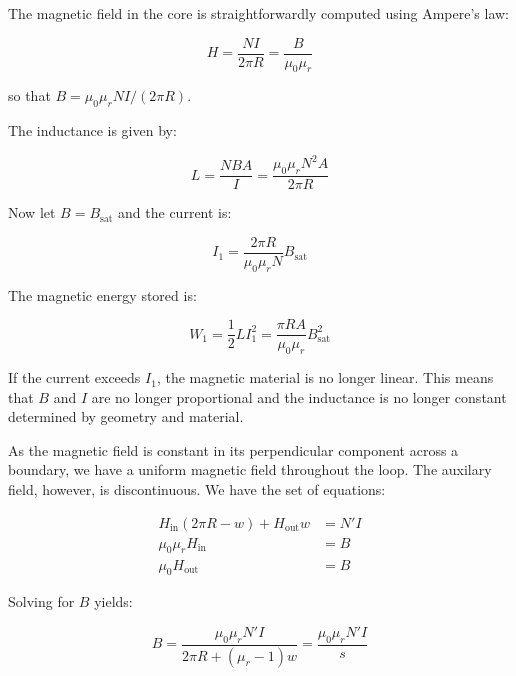 \documentclass[12pt]{article}
\begin{document}

The magnetic field in the core is straightforwardly computed using Ampere's law:

\begin{equation}
    H = \frac{NI}{2\pi R} = \frac{B}{\mu_{0} \mu_{r}}
\end{equation}

so that $B = \mu_{0} \mu_{r} NI/(2\pi R)$.

The inductance is given by:

\begin{equation}
    L = \frac{NBA}{I} = \frac{\mu_{0} \mu_{r} N^{2} A}{2\pi R}
\end{equation}

Now let $B = B_{\text{sat}}$ and the current is:

\begin{equation}
    I_{1} = \frac{2\pi R}{\mu_{0} \mu_{r} N} B_{\text{sat}}
\end{equation}

The magnetic energy stored is:

\begin{equation}
    W_{1} = \frac{1}{2} LI_{1}^{2} = \frac{\pi RA}{\mu_{0} \mu_{r}} B_{\text{sat}}^{2}
\end{equation}

If the current exceeds $I_{1}$, the magnetic material is no longer linear. This means that $B$ and $I$ are no longer proportional and the inductance is no longer constant determined by geometry and material.

As the magnetic field is constant in its perpendicular component across a boundary, we have a uniform magnetic field throughout the loop. The auxilary field, however, is discontinuous. We have the set of equations:

\begin{equation}
    \begin{split}
        H_{\text{in}} (2\pi R - w) + H_{\text{out}} w &= N'I \\
        \mu_{0} \mu_{r} H_{\text{in}} &= B \\
        \mu_{0} H_{\text{out}} &= B
    \end{split}
\end{equation}

Solving for $B$ yields:

\begin{equation}
    B = \frac{\mu_{0} \mu_{r} N'I}{2\pi R + (\mu_{r} - 1) w} = \frac{\mu_{0} \mu_{r} N'I}{s}
\end{equation}
\end{document}
